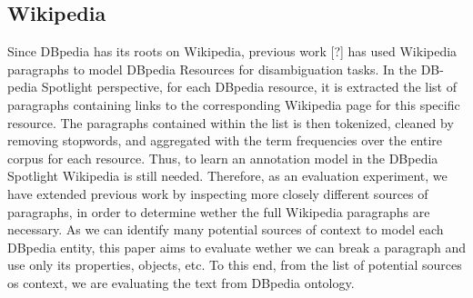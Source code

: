 \documentclass[10pt,a4paper]{article}
\begin{document}





\subsection{Wikipedia}

Since DBpedia has its roots on Wikipedia, previous work [?] has used Wikipedia paragraphs to model DBpedia Resources for disambiguation tasks. In the DB- pedia Spotlight perspective, for each DBpedia resource, it is extracted the list of paragraphs containing links to the corresponding Wikipedia page for this specific resource. The paragraphs contained within the list is then tokenized, cleaned by removing stopwords, and aggregated with the term frequencies over the entire corpus for each resource. Thus, to learn an annotation model in the DBpedia Spotlight Wikipedia is still needed.
Therefore, as an evaluation experiment, we have extended previous work by inspecting more closely different sources of paragraphs, in order to determine wether the full Wikipedia paragraphs are necessary. As we can identify many potential sources of context to model each DBpedia entity, this paper aims to evaluate wether we can break a paragraph and use only its properties, objects, etc. To this end, from the list of potential sources os context, we are evaluating the text from DBpedia ontology.
\end{document}
